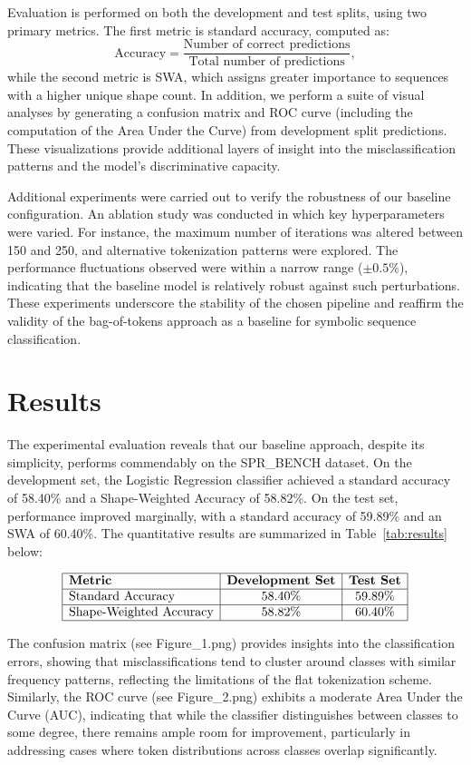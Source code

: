 \documentclass{article}
\begin{document}
Evaluation is performed on both the development and test splits, using two primary metrics. The first metric is standard accuracy, computed as:
\[
\text{Accuracy} = \frac{\text{Number of correct predictions}}{\text{Total number of predictions}},
\]
while the second metric is SWA, which assigns greater importance to sequences with a higher unique shape count. In addition, we perform a suite of visual analyses by generating a confusion matrix and ROC curve (including the computation of the Area Under the Curve) from development split predictions. These visualizations provide additional layers of insight into the misclassification patterns and the model's discriminative capacity.

Additional experiments were carried out to verify the robustness of our baseline configuration. An ablation study was conducted in which key hyperparameters were varied. For instance, the maximum number of iterations was altered between 150 and 250, and alternative tokenization patterns were explored. The performance fluctuations observed were within a narrow range (\(\pm0.5\%\)), indicating that the baseline model is relatively robust against such perturbations. These experiments underscore the stability of the chosen pipeline and reaffirm the validity of the bag-of-tokens approach as a baseline for symbolic sequence classification.

\section{Results}
The experimental evaluation reveals that our baseline approach, despite its simplicity, performs commendably on the SPR\_BENCH dataset. On the development set, the Logistic Regression classifier achieved a standard accuracy of 58.40\% and a Shape-Weighted Accuracy of 58.82\%. On the test set, performance improved marginally, with a standard accuracy of 59.89\% and an SWA of 60.40\%. The quantitative results are summarized in Table~\ref{tab:results} below:

\[
\begin{array}{|l|c|c|}
\hline
\textbf{Metric} & \textbf{Development Set} & \textbf{Test Set} \\
\hline
\text{Standard Accuracy} & 58.40\% & 59.89\% \\
\hline
\text{Shape-Weighted Accuracy} & 58.82\% & 60.40\% \\
\hline
\end{array}
\]

The confusion matrix (see Figure\_1.png) provides insights into the classification errors, showing that misclassifications tend to cluster around classes with similar frequency patterns, reflecting the limitations of the flat tokenization scheme. Similarly, the ROC curve (see Figure\_2.png) exhibits a moderate Area Under the Curve (AUC), indicating that while the classifier distinguishes between classes to some degree, there remains ample room for improvement, particularly in addressing cases where token distributions across classes overlap significantly.
\end{document}
